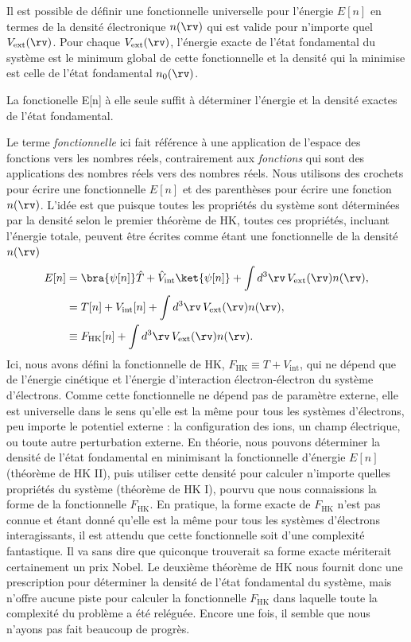 \begin{theo}
    \label{thm:hk2}
    Il est possible de définir une fonctionnelle universelle pour l'énergie $E[n]$ en termes de la densité électronique $n(\rv)$ qui est valide pour n'importe quel $V_\text{ext}(\rv)$. Pour chaque $V_\text{ext}(\rv)$, l'énergie exacte de l'état fondamental du système est le minimum global de cette fonctionnelle et la densité qui la minimise est celle de l'état fondamental $n_0(\rv)$. 
\end{theo}
\begin{cor}
    \label{cor:hk2}
    La fonctionelle E[n] à elle seule suffit à déterminer l'énergie et la densité exactes de l'état fondamental. 
\end{cor}
\noindent
Le terme \textit{fonctionnelle} ici fait référence à une application de l'espace des fonctions vers les nombres réels, contrairement aux \textit{fonctions} qui sont des applications des nombres réels vers des nombres réels. Nous utilisons des crochets pour écrire une fonctionnelle $E[n]$ et des parenthèses pour écrire une fonction $n(\rv)$. L'idée est que puisque toutes les propriétés du système sont déterminées par la densité selon le premier théorème de HK, toutes ces propriétés, incluant l'énergie totale, peuvent être écrites comme étant une fonctionnelle de la densité $n(\rv)$
\begin{align}
    E[n]&=\bra{\psi[n]}\hat{T}+\hat{V}_\text{int}\ket{\psi[n]}+\int d^3\rv\,V_\text{ext}(\rv)n(\rv),\notag\\
    &= T[n]+V_\text{int}[n]+\int d^3\rv\,V_\text{ext}(\rv)n(\rv),\notag\\
    &\equiv F_\text{HK}[n]+\int d^3\rv\,V_\text{ext}(\rv)n(\rv).
\end{align}
Ici, nous avons défini la fonctionnelle de HK, $F_\text{HK}\equiv T+V_\text{int}$, qui ne dépend que de l'énergie cinétique et l'énergie d'interaction électron-électron du système d'électrons. Comme cette fonctionnelle ne dépend pas de paramètre externe, elle est universelle dans le sens qu'elle est la même pour tous les systèmes d'électrons, peu importe le potentiel externe : la configuration des ions, un champ électrique, ou toute autre perturbation externe. En théorie, nous pouvons déterminer la densité de l'état fondamental en minimisant la fonctionnelle d'énergie $E[n]$ (théorème de HK II), puis utiliser cette densité pour calculer n'importe quelles propriétés du système (théorème de HK I), pourvu que nous connaissions la forme de la fonctionnelle $F_\text{HK}$. En pratique, la forme exacte de $F_\text{HK}$ n'est pas connue et étant donné qu'elle est la même pour tous les systèmes d'électrons interagissants, il est attendu que cette fonctionnelle soit d'une complexité fantastique. Il va sans dire que quiconque trouverait sa forme exacte mériterait certainement un prix Nobel. Le deuxième théorème de HK nous fournit donc une prescription pour déterminer la densité de l'état fondamental du système, mais n'offre aucune piste pour calculer la fonctionnelle $F_\text{HK}$ dans laquelle toute la complexité du problème a été reléguée. Encore une fois, il semble que nous n'ayons pas fait beaucoup de progrès.

